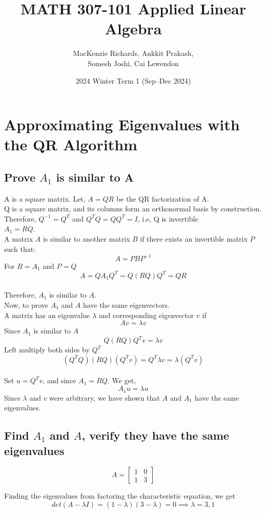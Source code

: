 \documentclass[12pt]{article}
\title{MATH 307-101
Applied Linear Algebra}
\author{MacKenzie Richards, Ankkit Prakash, \\ Somesh Joshi, Cai Lewendon}
\date{2024 Winter Term 1 (Sep–Dec 2024)}
\begin{document}
\maketitle
\section{Approximating Eigenvalues with the QR Algorithm}
\subsection{Prove $A_1$ is similar to A}
    A is a square matrix. Let, $A = QR$ be the QR factorization of A. \\
    Q is a square matrix, and its columns form an orthonormal basis by construction. \\
    Therefore, $Q^{-1} = Q^T$ and $Q^{T}Q = QQ^T = I$, i.e, Q is invertible\\
    $A_1 = RQ$.\\ 
    A matrix $A$ is similar to another matrix $B$ if there exists an invertible matrix $P$ such that:
    $$A = PBP^{-1}$$
    For $B = A_1$ and $P = Q$ \\
    $$A = QA_{1}Q^T = Q (RQ) Q^T = QR$$ \\
    Therefore, $A_1$ is similar to $A$. \\ 
    Now, to prove $A_1$ and $A$ have the same eigenvectors. \\
    A matrix has an eigenvalue $\lambda$ and corresponding eigenvector $v$ if \\
    $$Av = \lambda v$$
    Since $A_1$ is similar to $A$
    $$Q (RQ) Q^T v = \lambda v$$
    Left multiply both sides by $Q^T$
    $$ (Q^{T}Q) (RQ) (Q^{T}v) = Q^{T} \lambda v = \lambda (Q^{T}v)$$ \\
    Set $u = Q^{T} v$, and since $A_1 = RQ$. We get, \\
    $$ A_1 u = \lambda u$$
    Since $\lambda$ and $v$ were arbitrary, we have shown that $A$ and $A_1$ have the same eigenvalues.

\subsection{Find $A_1$ and $A$, verify they have the same eigenvalues}

$$
A = \begin{bmatrix}
1 & 0 \\
1 & 3 
\end{bmatrix} 
$$

    Finding the eigenvalues from factoring the characteristic equation, we get \\
    $$det(A - \lambda I) = (1 - \lambda)(3 - \lambda) = 0 \implies \lambda = 3,1$$ \\
\end{document}
